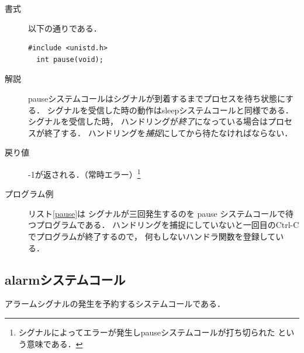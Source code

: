 \begin{description}
\item[書式] 以下の通りである．

\begin{lstlisting}[numbers=none]
  #include <unistd.h>
  int pause(void);
\end{lstlisting}

\item[解説]
  pauseシステムコールはシグナルが到着するまでプロセスを待ち状態にする．
  シグナルを受信した時の動作はsleepシステムコールと同様である．
  シグナルを受信した時，
  ハンドリングが\emph{終了}になっている場合はプロセスが終了する．
  ハンドリングを\emph{捕捉}にしてから待たなければならない．

\item[戻り値]
  -1が返される．（常時エラー）\footnote{
    シグナルによってエラーが発生しpauseシステムコールが打ち切られた
    という意味である．
  }

\item[プログラム例]
  リスト\ref{pause}は
  シグナルが三回発生するのを pause システムコールで待つプログラムである．
  ハンドリングを捕捉にしていないと一回目のCtrl-Cでプログラムが終了するので，
  何もしないハンドラ関数を登録している．

  

\end{description}

\subsection{alarmシステムコール}
アラームシグナルの発生を予約するシステムコールである．

